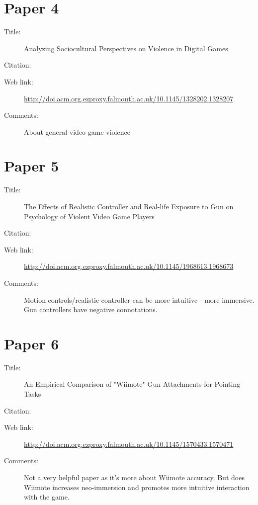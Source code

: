 \documentclass{scrartcl}
\begin{document}
\section*{Paper 4}
\begin{description}
	\item[Title:] Analyzing Sociocultural Perspectives on Violence in Digital Games
	\item[Citation:] \cite{Thayer}
	\item[Web link:] \url{http://doi.acm.org.ezproxy.falmouth.ac.uk/10.1145/1328202.1328207}
	\item[Comments:] About general video game violence 
\end{description}

\section*{Paper 5}
\begin{description}
	\item[Title:] The Effects of Realistic Controller and Real-life Exposure to Gun on Psychology of Violent Video Game Players
	\item[Citation:] \cite{Kim}
	\item[Web link:] \url{http://doi.acm.org.ezproxy.falmouth.ac.uk/10.1145/1968613.1968673}
	\item[Comments:] Motion controls/realistic controller can be more intuitive - more immersive. Gun controllers have negative connotations.  
\end{description}


\section*{Paper 6}
\begin{description}
	\item[Title:] An Empirical Comparison of "Wiimote" Gun Attachments for Pointing Tasks
	\item[Citation:] \cite{McArthur}
	\item[Web link:] \url{http://doi.acm.org.ezproxy.falmouth.ac.uk/10.1145/1570433.1570471}
	\item[Comments:] Not a very helpful paper as it's more about Wiimote accuracy. But does Wiimote increases neo-immersion and promotes more intuitive interaction with the game.
\end{description}
\end{document}
